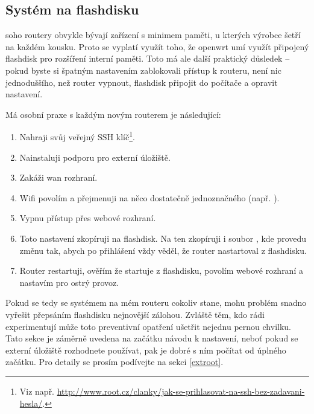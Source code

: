 \subsection{Systém na flashdisku}
\label{firstboot:extroot}
\gls{soho} routery obvykle bývají zařízení s minimem paměti, u kterých výrobce
šetří na každém kousku. Proto se vyplatí využít toho, že \gls{openwrt} umí
využít připojený flashdisk pro rozšíření interní paměti. Toto má ale další
praktický důsledek -- pokud byste si špatným nastavením zablokovali přístup
k routeru, není nic
jednoduššího, než router vypnout, flashdisk připojit do počítače a opravit
nastavení.

Má osobní praxe s každým novým routerem je následující:
\begin{enumerate}
\item Nahraji svůj veřejný
SSH klíč\footnote{Viz např. \url{http://www.root.cz/clanky/jak-se-prihlasovat-na-ssh-bez-zadavani-hesla/}.}.
\item Nainstaluji podporu pro externí úložiště.
\item Zakáži \gls{wan} rozhraní.
\item Wifi povolím a přejmenuji na něco dostatečně jednoznačného (např. ).
\item Vypnu přístup přes webové rozhraní.
\item Toto nastavení zkopíruji na flashdisk. Na ten zkopíruji i soubor
, kde provedu změnu tak, abych po přihlášení vždy věděl, že
router nastartoval z flashdisku.
\item Router restartuji, ověřím že startuje z flashdisku, povolím webové
rozhraní a nastavím pro ostrý provoz.
\end{enumerate}

Pokud se tedy se systémem na mém routeru cokoliv stane, mohu problém snadno
vyřešit přepsáním flashdisku nejnovější zálohou. Zvláště těm, kdo rádi experimentují
může toto preventivní opatření ušetřit nejednu pernou chvilku.
Tato sekce je záměrně uvedena na začátku návodu k nastavení, neboť pokud
se externí úložiště rozhodnete používat, pak je dobré s ním počítat od úplného
začátku.
Pro detaily
se prosím podívejte na sekci \ref{extroot}.
